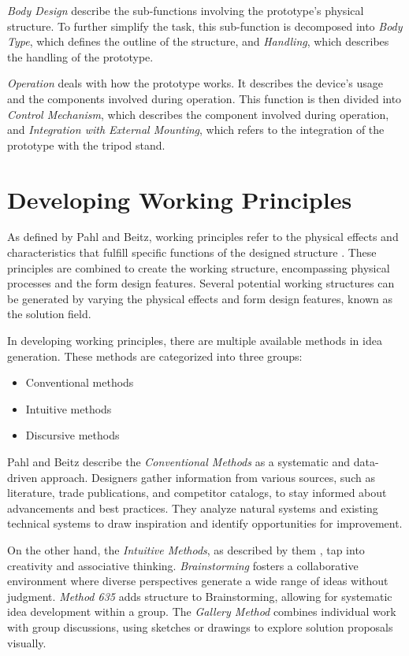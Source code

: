 \textit{Body Design} describe the sub-functions involving the prototype's physical structure. To further simplify the task, this sub-function is decomposed into \textit{Body Type}, which defines the outline of the structure, and \textit{Handling}, which describes the handling of the prototype.

\textit{Operation} deals with how the prototype works. It describes the device's usage and the components involved during operation. This function is then divided into \textit{Control Mechanism}, which describes the component involved during operation, and \textit{Integration with External Mounting}, which refers to the integration of the prototype with the tripod stand.

\section{Developing Working Principles}

As defined by Pahl and Beitz, working principles refer to the physical effects and characteristics that fulfill specific functions of the designed structure \cite[181]{Pahl2007}. These principles are combined to create the working structure, encompassing physical processes and the form design features. Several potential working structures can be generated by varying the physical effects and form design features, known as the solution field.

In developing working principles, there are multiple available methods in idea generation. These methods are categorized into three groups:

\begin{itemize}
    \item Conventional methods
    \item Intuitive methods
    \item Discursive methods
\end{itemize}

Pahl and Beitz \cite[18-82]{Pahl2007} describe the \textit{Conventional Methods} as a systematic and data-driven approach. Designers gather information from various sources, such as literature, trade publications, and competitor catalogs, to stay informed about advancements and best practices. They analyze natural systems and existing technical systems to draw inspiration and identify opportunities for improvement.

On the other hand, the \textit{Intuitive Methods}, as described by them \cite[82-89]{Pahl2007}, tap into creativity and associative thinking. \textit{Brainstorming} fosters a collaborative environment where diverse perspectives generate a wide range of ideas without judgment. \textit{Method 635} adds structure to Brainstorming, allowing for systematic idea development within a group. The \textit{Gallery Method} combines individual work with group discussions, using sketches or drawings to explore solution proposals visually.

